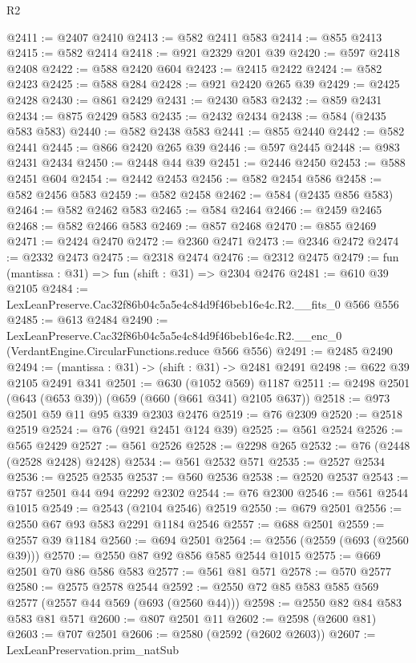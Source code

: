 \begin{lexlean}{R2}
\begin{coremodule}
@2411 := @2407 @2410
@2413 := @582 @2411 @583
@2414 := @855 @2413
@2415 := @582 @2414
@2418 := @921 @2329 @201 @39
@2420 := @597 @2418 @2408
@2422 := @588 @2420 @604
@2423 := @2415 @2422
@2424 := @582 @2423
@2425 := @588 @284
@2428 := @921 @2420 @265 @39
@2429 := @2425 @2428
@2430 := @861 @2429
@2431 := @2430 @583
@2432 := @859 @2431
@2434 := @875 @2429 @583
@2435 := @2432 @2434
@2438 := @584 (@2435 @583 @583)
@2440 := @582 @2438 @583
@2441 := @855 @2440
@2442 := @582 @2441
@2445 := @866 @2420 @265 @39
@2446 := @597 @2445
@2448 := @983 @2431 @2434
@2450 := @2448 @44 @39
@2451 := @2446 @2450
@2453 := @588 @2451 @604
@2454 := @2442 @2453
@2456 := @582 @2454 @586
@2458 := @582 @2456 @583
@2459 := @582 @2458
@2462 := @584 (@2435 @856 @583)
@2464 := @582 @2462 @583
@2465 := @584 @2464
@2466 := @2459 @2465
@2468 := @582 @2466 @583
@2469 := @857 @2468
@2470 := @855 @2469
@2471 := @2424 @2470
@2472 := @2360 @2471
@2473 := @2346 @2472
@2474 := @2332 @2473
@2475 := @2318 @2474
@2476 := @2312 @2475
@2479 := fun (mantissa : @31) => fun (shift : @31) => @2304 @2476
@2481 := @610 @39 @2105
@2484 := LexLeanPreserve.Cac32f86b04c5a5e4c84d9f46beb16e4c.R2.__fits_0 @566 @556
@2485 := @613 @2484
@2490 := LexLeanPreserve.Cac32f86b04c5a5e4c84d9f46beb16e4c.R2.__enc_0
    (VerdantEngine.CircularFunctions.reduce @566 @556)
@2491 := @2485 @2490
@2494 := (mantissa : @31) -> (shift : @31) -> @2481 @2491
@2498 := @622 @39 @2105 @2491 @341
@2501 := @630 (@1052 @569) @1187
@2511 := @2498 @2501 (@643 (@653 @39)) (@659 (@660 (@661 @341) @2105 @637))
@2518 := @973 @2501 @59 @11 @95 @339 @2303 @2476
@2519 := @76 @2309
@2520 := @2518 @2519
@2524 := @76 (@921 @2451 @124 @39)
@2525 := @561 @2524
@2526 := @565 @2429
@2527 := @561 @2526
@2528 := @2298 @265
@2532 := @76 (@2448 (@2528 @2428) @2428)
@2534 := @561 @2532 @571
@2535 := @2527 @2534
@2536 := @2525 @2535
@2537 := @560 @2536
@2538 := @2520 @2537
@2543 := @757 @2501 @44 @94 @2292 @2302
@2544 := @76 @2300
@2546 := @561 @2544 @1015
@2549 := @2543 (@2104 @2546) @2519
@2550 := @679 @2501
@2556 := @2550 @67 @93 @583 @2291 @1184 @2546
@2557 := @688 @2501
@2559 := @2557 @39 @1184
@2560 := @694 @2501
@2564 := @2556 (@2559 (@693 (@2560 @39)))
@2570 := @2550 @87 @92 @856 @585 @2544 @1015
@2575 := @669 @2501 @70 @86 @586 @583
@2577 := @561 @81 @571
@2578 := @570 @2577
@2580 := @2575 @2578 @2544
@2592 := @2550 @72 @85 @583 @585 @569 @2577 (@2557 @44 @569 (@693 (@2560 @44)))
@2598 := @2550 @82 @84 @583 @583 @81 @571
@2600 := @807 @2501 @11
@2602 := @2598 (@2600 @81)
@2603 := @707 @2501
@2606 := @2580 (@2592 (@2602 @2603))
@2607 := LexLeanPreservation.prim_natSub

\end{coremodule}
\end{lexlean}
